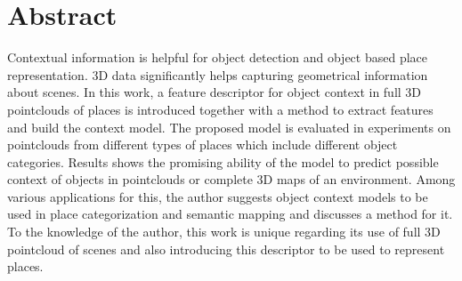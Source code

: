 \cleardoublepage
{}
{}
\chapter*{Abstract}
Contextual information is helpful for object detection and object based place representation. 
3D data significantly helps capturing geometrical information about scenes.
In this work, a feature descriptor  for object context in full 3D pointclouds of places is introduced together with a 
method to extract features and build the context model.
The proposed model is evaluated in experiments on pointclouds from different types of places which include different object 
categories.
Results shows the promising ability of the model to predict possible context of objects in pointclouds or complete 3D maps of 
an environment. 
Among various applications for this, the author suggests object context models to be used in place categorization and semantic
mapping and discusses a method for it.
To the knowledge of the author, this work is unique regarding its use of full 3D pointcloud of scenes and also introducing 
this descriptor to be used to represent places. 